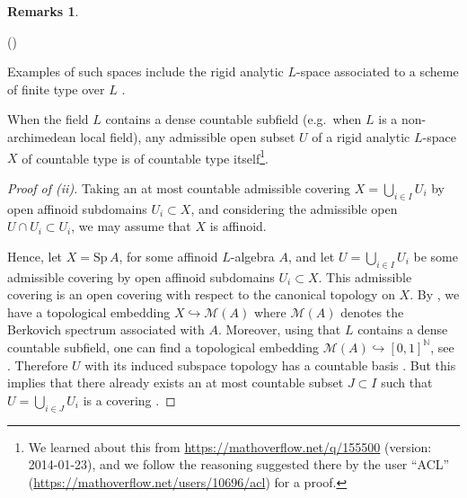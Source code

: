 \documentclass[a4paper, reqno, 10pt]{amsart}
\theoremstyle{definition}
\newtheorem{remarks}[theorem]{Remarks}
\newenvironment{altenumerate}
	{\begin{list}
		{\textup{(\theenumi)} }
		{\usecounter{enumi}
			\setlength{\labelwidth}{0pt}
			\setlength{\labelsep}{0pt}
			\setlength{\leftmargin}{0pt}
			\setlength{\itemsep}{0pt}
			\setlength{\topsep}{0pt}
		\renewcommand{\theenumi}{\roman{enumi}}
		}}
	{\end{list}}
\numberwithin{equation}{section}
\newcommand{\Sp}{{\mathrm{Sp}}}
\newcommand{\BN}{{\mathbb {N}}}
\newcommand{\CM}{{\mathcal {M}}}
\begin{document}
\begin{remarks}\label{Rmks 1 - About rigid analytic spaces of countable type}
	\begin{altenumerate}
		\item
		Examples of such spaces include the rigid analytic $L$-space associated to a scheme of finite type over $L$ \cite[Rmk.\ 2.5.11]{deJongvanderPut96EtaleCohomRigidAnSp}.
		\item
		When the field $L$ contains a dense countable subfield (e.g.\ when $L$ is a non-archimedean local field), any admissible open subset $U$ of a rigid analytic $L$-space $X$ of countable type is of countable type itself\footnote{We learned about this from \url{https://mathoverflow.net/q/155500} (version: 2014-01-23), and we follow the reasoning suggested there by the user ``ACL'' (\url{https://mathoverflow.net/users/10696/acl}) for a proof.}.
	\end{altenumerate}
\end{remarks}
\begin{proof}[{Proof of (ii)}]
	Taking an at most countable admissible covering $X = \bigcup_{i\in I} U_i$ by open affinoid subdomains $U_i\subset X$, and considering the admissible open $U\cap U_i \subset U_i$, we may assume that $X$ is affinoid.
	
	
	Hence, let $X = \Sp\,A$, for some affinoid $L$-algebra $A$, and let $U=\bigcup_{i\in I} U_i$ be some admissible covering by open affinoid subdomains $U_i \subset X$.
	This admissible covering is an open covering with respect to the canonical topology on $X$.
	By \cite[Prop.\ 2.1.15]{Berkovich90SpecThAnGeom}, we have a topological embedding $X \hookrightarrow \CM(A)$ where $\CM(A)$ denotes the Berkovich spectrum associated with $A$.
	Moreover, using that $L$ contains a dense countable subfield, one can find a topological embedding $\CM(A) \hookrightarrow [0,1]^\BN$, see \cite[p.\ 4]{Chambert-Loir07MesEtEquiDistEspBerkovich}.
	Therefore $U$ with its induced subspace topology has a countable basis \cite[Ch.\ IX.\ \S 2.8 Prop.\ 12]{Bourbaki66GenTop2}.
	But this implies that there already exists an at most countable subset $J\subset I$ such that $U = \bigcup_{i\in J} U_i$ is a covering \cite[Ch.\ IX.\ \S 2.8 Prop.\ 13]{Bourbaki66GenTop2}.
\end{proof}
\end{document}
